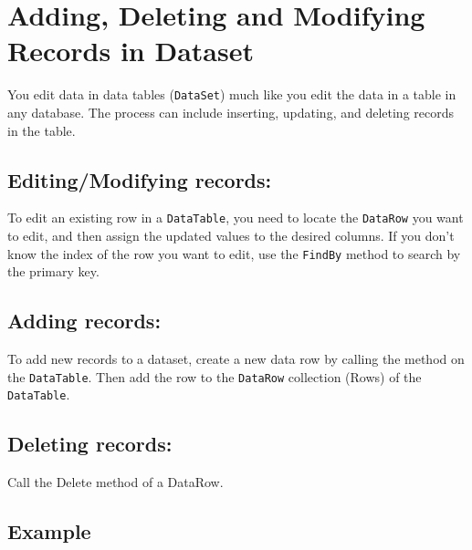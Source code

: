 \section{Adding, Deleting and Modifying Records in Dataset}
You edit data in data tables (\texttt{DataSet}) much like you edit the data in a table in any database. The process can include
inserting, updating, and deleting records in the table.

\subsection*{Editing/Modifying records:}
To edit an existing row in a \texttt{DataTable}, you need to locate the \texttt{DataRow} you want to edit, and then assign the updated
values to the desired columns. If you don't know the index of the row you want to edit, use the \texttt{FindBy} method to search
by the primary key.

\subsection*{Adding records:}
To add new records to a dataset, create a new data row by calling the method on the \texttt{DataTable}. Then add the row to
the \texttt{DataRow} collection (Rows) of the \texttt{DataTable}.

\subsection*{Deleting records:}
Call the Delete method of a DataRow.

\subsection*{Example}



